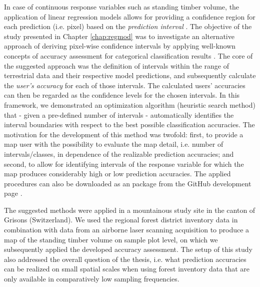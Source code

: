 In case of continuous response variables such as standing timber volume, the application of linear regression models allows for providing a confidence region for each prediction (i.e. pixel) based on the \textit{prediction interval} \citep[pp.136--139]{fahrmeir2013}. The objective of the study presented in Chapter \ref{chap:regmod} was to investigate an alternative approach of deriving pixel-wise confidence intervals by applying well-known concepts of accuracy assessment for categorical classification results \citep{congalton2008}. The core of the suggested approach was the definition of intervals within the range of terrestrial data and their respective model predictions, and subsequently calculate the \textit{user's accuracy} for each of those intervals. The calculated users' accuracies can then be regarded as the confidence levels for the chosen intervals. In this framework, we demonstrated an optimization algorithm (heuristic search method) that - given a pre-defined number of intervals - automatically identifies the interval boundaries with respect to the best possible classification accuracies. The motivation for the development of this method was twofold: first, to provide a map user with the possibility to evaluate the map detail, i.e. number of intervals/classes, in dependence of the realizable prediction accuracies; and second, to allow for identifying intervals of the response variable for which the map produces considerably high or low prediction accuracies. The applied procedures can also be downloaded as an  package from the GitHub development page \citep{github_classoptimr}.\par 

The suggested methods were applied in a mountainous study site in the canton of Grisons (Switzerland). We used the regional forest district inventory data in combination with data from an airborne laser scanning acquisition to produce a map of the standing timber volume on sample plot level, on which we subsequently applied the developed accuracy assessment. The setup of this study also addressed the overall question of the thesis, i.e. what prediction accuracies can be realized on small spatial scales when using forest inventory data that are only available in comparatively low sampling frequencies.


